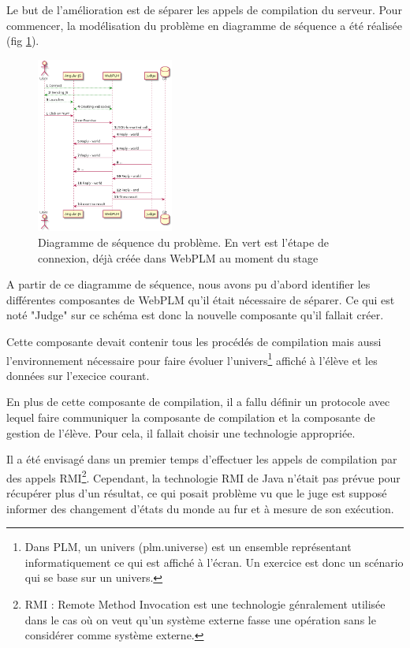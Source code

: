 \documentclass[stage]{tnreport}
\begin{document}
Le but de l'amélioration est de séparer les appels de compilation du serveur. Pour commencer, la modélisation du problème en diagramme de séquence a été réalisée (fig \ref{fig:wplmUS1}).
\begin{figure}[h]
	\centering
		\includegraphics[width=0.4\textwidth]{figures/WebPLM-uml-Seq1}
	\caption{Diagramme de séquence du problème. En vert est l'étape de connexion, déjà créée dans WebPLM au moment du stage}
	\label{fig:wplmUS1}
\end{figure}

A partir de ce diagramme de séquence, nous avons pu d'abord identifier les différentes composantes de WebPLM qu'il était nécessaire de séparer. Ce qui est noté "Judge" sur ce schéma est donc la nouvelle composante qu'il fallait créer.

Cette composante devait contenir tous les procédés de compilation mais aussi l'environnement nécessaire pour faire évoluer l'univers\footnote{Dans PLM, un univers (plm.universe) est un ensemble représentant informatiquement ce qui est affiché à l'écran. Un exercice est donc un scénario qui se base sur un univers.} affiché à l'élève et les données sur l'execice courant.

En plus de cette composante de compilation, il a fallu définir un protocole avec lequel faire communiquer la composante de compilation et la composante de gestion de l'élève. Pour cela, il fallait choisir une technologie appropriée. 

Il a été envisagé dans un premier temps d'effectuer les appels de compilation par des appels RMI\footnote{RMI : Remote Method Invocation est une technologie génralement utilisée dans le cas où on veut qu'un système externe fasse une opération sans le considérer comme système externe.}.
Cependant, la technologie RMI de Java n'était pas prévue pour récupérer plus d'un résultat, ce qui posait problème vu que le juge est supposé informer des changement d'états du monde au fur et à mesure de son exécution.
\end{document}
